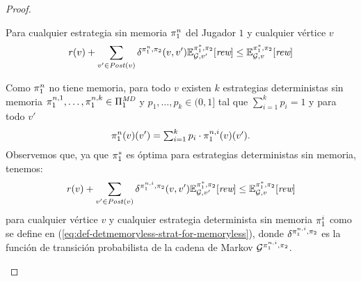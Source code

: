 \begin{proof}
  \begin{claim}
  Para cualquier estrategia sin memoria $\pi_{1}^n$ del Jugador $1$ y cualquier vértice $v$ 
  \begin{equation*}
    \mathit{r}(v) + \sum_{v' \in \mathit{Post}(v)} \delta^{\pi_{1}^n,\pi_{2}}(v, v') \mathbb{E}^{\pi^*_{1}, \pi_{2}}_{\mathcal{G},v'}[\textit{rew}] \leq \mathbb{E}^{\pi^*_{1}, \pi_{2}}_{\mathcal{G},v}[\textit{rew}]
  \end{equation*}
  \end{claim}
  \begin{proofofclaim}
    Como $\pi_{1}^n$ no tiene memoria, para todo $v$ existen $k$ estrategias deterministas sin memoria
    $\pi_{1}^{n,1},\ldots,\pi_{1}^{n,k}\in\Pi^{\textit{MD}}_{1}$ y
    $p_1,\ldots,p_k \in(0,1]$ tal que $\sum_{i=1}^kp_i =1$ y para todo $v'$
    \begin{equation}\label{eq:def-detmemoryless-strat-for-memoryless}
      \pi_{1}^{n}(v)(v')=\textstyle\sum_{i=1}^k p_i\cdot\pi_{1}^{n,i}(v)(v').
    \end{equation}
    Observemos que, ya que $\pi^*_{1}$ es óptima para estrategias deterministas sin memoria, tenemos:
    \begin{equation}\label{eq:semimarkov-to-detmemoryless:optimality}
      \mathit{r}(v) + \sum_{v' \in \mathit{Post}(v)} \delta^{\pi_{1}^{n,i},\pi_{2}}(v, v') \mathbb{E}^{\pi^*_{1}, \pi_{2}}_{\mathcal{G},v'}[\textit{rew}] \leq \mathbb{E}^{\pi^*_{1}, \pi_{2}}_{\mathcal{G},v}[\textit{rew}]
    \end{equation}
    para cualquier vértice $v$ y cualquier estrategia determinista sin memoria
    $\pi_{1}^i$ como se define en
    (\ref{eq:def-detmemoryless-strat-for-memoryless}), donde
    $\delta^{\pi_{1}^{n,i},\pi_{2}}$ es la función de transición probabilista de la cadena de Markov $\mathcal{G}^{\pi_{1}^{n,i},\pi_{2}}$.


\end{proofofclaim}
\end{proof}
